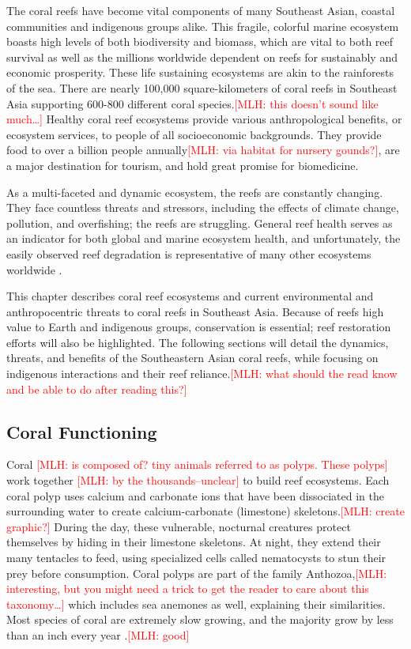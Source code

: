 \documentclass{book}\usepackage{knitr}
\newcommand{\red}[1]{\textcolor{red}{[MLH: #1]}}
\begin{document}
\begin{knitrout}
\begin{kframe}
{The coral reefs have become vital components of many Southeast Asian, coastal communities and indigenous groups alike. This fragile, colorful marine ecosystem boasts high levels of both biodiversity and biomass, which are vital to both reef survival as well as the millions worldwide dependent on reefs for sustainably and economic prosperity. These life sustaining ecosystems are akin to the rainforests of the sea. There are nearly 100,000 square-kilometers of coral reefs in Southeast Asia supporting 600-800 different coral species.\red{this doesn't sound like much\ldots} Healthy coral reef ecosystems provide various anthropological benefits, or ecosystem services, to people of all socioeconomic backgrounds. They provide food to over a billion people annually\red{via habitat for nursery gounds?}, are a major destination for tourism, and hold great promise for biomedicine. 

As a multi-faceted and dynamic ecosystem, the reefs are constantly changing. They face countless threats and stressors, including the effects of climate change, pollution, and overfishing; the reefs are struggling. General reef health serves as an indicator for both global and marine ecosystem health, and unfortunately, the easily observed reef degradation is representative of many other ecosystems worldwide \citep{RAR}.

This chapter describes coral reef ecosystems and current environmental and anthropocentric threats to coral reefs in Southeast Asia.  Because of reefs high value to Earth and indigenous groups, conservation is essential; reef restoration efforts will also be highlighted. The following sections will detail the dynamics, threats, and benefits of the Southeastern Asian coral reefs, while focusing on indigenous interactions and their reef reliance.\red{what should the read know and be able to do after reading this?}

\subsection{Coral Functioning}

Coral \red{is composed of? tiny animals referred to as polyps. These polyps} work together \red{by the thousands--unclear} to build reef ecosystems. Each coral polyp uses calcium and carbonate ions that have been dissociated in the surrounding water to create calcium-carbonate (limestone) skeletons.\red{create graphic?} During the day, these vulnerable, nocturnal creatures protect themselves by hiding in their limestone skeletons. At night, they extend their many tentacles to feed, using specialized cells called nematocysts to stun their prey before consumption. Coral polyps are part of the family Anthozoa,\red{interesting, but you might need a trick to get the reader to care about this taxonomy\ldots} which includes sea anemones as well, explaining their similarities. Most species of coral are extremely slow growing, and the majority grow by less than an inch every year \citep{coralreefalliance_2021}.\red{good}

}
\end{kframe}
\end{knitrout}
\end{document}
